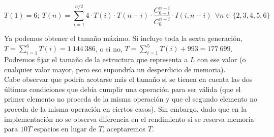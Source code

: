 $$T(1) = 6;\ T(n) = \sum_{i=1}^{n/2} 4 \cdot T(i) \cdot T(n-i) \cdot \frac {C_{6-i}^{n-i}} {C_6^{n-i}} \cdot I(i,n-i) \ \ \forall n \in \{2,3,4,5,6\}$$

Ya podemos obtener el tamaño máximo. Si incluye toda la sexta generación, $\displaystyle T = \sum_{i=1}^6 T(i) = 1\ 144\ 386$, o si no, $\displaystyle T = \sum_{i=1}^5 T(i) + 993 = 177\ 699$. Podremos fijar el tamaño de la estructura que representa a $L$ con ese valor (o cualquier valor mayor, pero eso supondría un desperdicio de memoria). \\

Cabe observar que podría acotarse más el tamaño si se tienen en cuenta las dos últimas condiciones que debía cumplir una operación para ser válida (que el primer elemento no proceda de la misma operación y que el segundo elemento no proceda de la misma operación en ciertos casos). Sin embargo, dado que en la implementación no se observa diferencia en el rendimiento si se reserva memoria para $10T$ espacios en lugar de $T$, aceptaremos $T$.